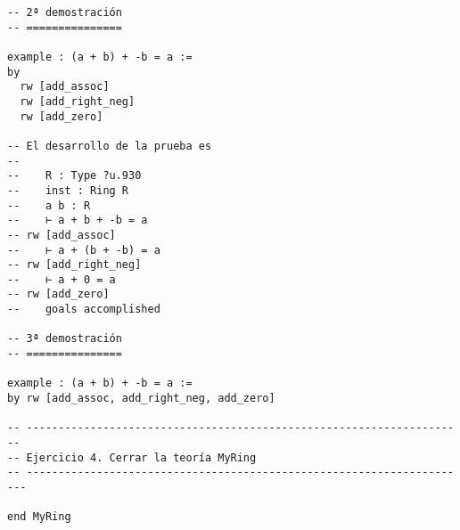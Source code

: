 \begin{verbatim}
-- 2ª demostración
-- ===============

example : (a + b) + -b = a :=
by
  rw [add_assoc]
  rw [add_right_neg]
  rw [add_zero]

-- El desarrollo de la prueba es
--
--    R : Type ?u.930
--    inst : Ring R
--    a b : R
--    ⊢ a + b + -b = a
-- rw [add_assoc]
--    ⊢ a + (b + -b) = a
-- rw [add_right_neg]
--    ⊢ a + 0 = a
-- rw [add_zero]
--    goals accomplished

-- 3ª demostración
-- ===============

example : (a + b) + -b = a :=
by rw [add_assoc, add_right_neg, add_zero]

-- ---------------------------------------------------------------------
-- Ejercicio 4. Cerrar la teoría MyRing
-- ----------------------------------------------------------------------

end MyRing
\end{verbatim}

